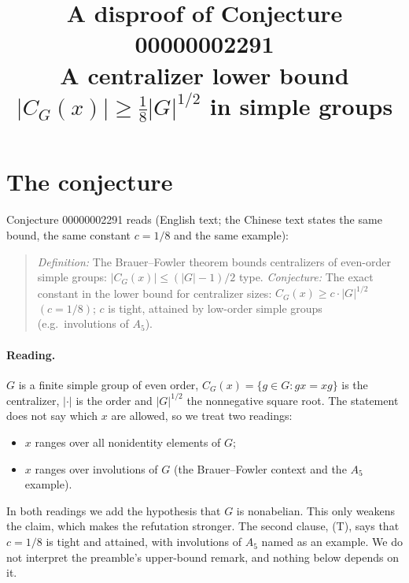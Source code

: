 \documentclass[11pt]{article}
\title{A disproof of Conjecture 00000002291\\[2pt]
\large A centralizer lower bound $|C_G(x)|\ge \tfrac18|G|^{1/2}$ in simple groups}
\date{}
\theoremstyle{definition}
\theoremstyle{remark}
\renewcommand{\_}{\oldus\allowbreak}
\begin{document}
\sloppy
\maketitle

\section{The conjecture}

Conjecture 00000002291 reads (English text; the Chinese text states the same bound, the same constant
$c=1/8$ and the same example):

\begin{quote}
\emph{Definition:} The Brauer--Fowler theorem bounds centralizers of even-order simple groups:
$|C_G(x)| \le (|G|-1)/2$ type.
\emph{Conjecture:} The exact constant in the lower bound for centralizer sizes:
$C_G(x) \ge c\cdot|G|^{1/2}$ $(c = 1/8)$; $c$ is tight, attained by low-order simple groups
(e.g.\ involutions of $A_5$).
\end{quote}

\paragraph{Reading.} $G$ is a finite simple group of even order, $C_G(x)=\{g\in G: gx=xg\}$ is the
centralizer, $|\cdot|$ is the order and $|G|^{1/2}$ the nonnegative square root. The statement does not
say which $x$ are allowed, so we treat two readings:
\begin{itemize}[leftmargin=2em]
\item[(R1)] $x$ ranges over all nonidentity elements of $G$;
\item[(R2)] $x$ ranges over involutions of $G$ (the Brauer--Fowler context and the $A_5$ example).
\end{itemize}
In both readings we add the hypothesis that $G$ is nonabelian. This only weakens the claim, which makes the
refutation stronger. The second clause, (T), says that $c=1/8$ is tight and attained, with involutions of
$A_5$ named as an example. We do not interpret the preamble's upper-bound remark, and nothing below depends
on it.
\end{document}
